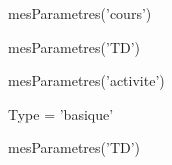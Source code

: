\documentclass{classe-tex3R}
\begin{document}
\begin{luacode}
  mesParametres('cours')
\end{luacode}
\parametrage

  \lipsum[1-10]

\begin{luacode}
  mesParametres('TD')
\end{luacode}
\parametrage

\begin{landscape}
  \lipsum[1-10]
\end{landscape}

\begin{luacode}
  mesParametres('activite')
\end{luacode}
\parametrage

\lipsum[21-30]

\begin{luacode}
  Type = 'basique'
\end{luacode}
\parametrage

\begin{landscape}
  \lipsum[21-30]
\end{landscape}

\begin{luacode}
  mesParametres('TD')
\end{luacode}
\parametrage

\lipsum[21-30]
\end{document}
